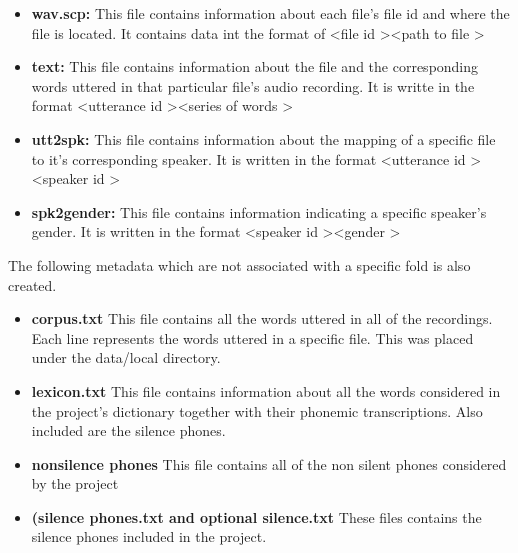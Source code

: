 \begin{itemize}
    \item \textbf{wav.scp:} This file contains information about each file's file id and where the file is located. It contains data int the format of \textless file \textunderscore id \textgreater \textless path \textunderscore to \textunderscore file \textgreater 
    
    \item \textbf{text:} This file contains information about the file and the corresponding words uttered in that particular file's audio recording. It is writte in the format \textless utterance \textunderscore id \textgreater \textless series \textunderscore of \textunderscore words \textgreater
    
    \item \textbf{utt2spk:} This file contains information about the mapping of a specific file to it's corresponding speaker. It is written in the format \textless utterance \textunderscore id \textgreater \textless speaker \textunderscore id \textgreater

    \item \textbf{spk2gender:} This file contains information indicating a specific speaker's gender. It is written in the format \textless speaker \textunderscore id \textgreater \textless gender \textgreater
    
\end{itemize}

The following metadata which are not associated with a specific fold is also created.

\begin{itemize}
    \item \textbf{corpus.txt} This file contains all the words uttered in all of the recordings. Each line represents the words uttered in a specific file. This was placed under the data/local directory.

    \item \textbf{lexicon.txt} This file contains information about all the words considered in the project's dictionary together with their phonemic transcriptions. Also included are the silence phones.

    \item \textbf{nonsilence \textunderscore phones} This file contains all of the non silent phones considered by the project

    \item \textbf{(silence \textunderscore phones.txt and  optional \textunderscore silence.txt} These files contains the silence phones included in the project.
    
\end{itemize}

